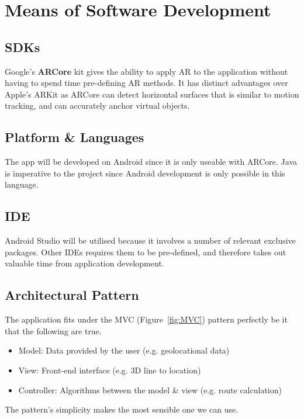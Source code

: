 
\section{Means of Software Development}

\subsection*{SDKs}
Google's \textbf{ARCore} kit gives the ability to apply AR to the application without having to spend time pre-defining AR methods. It has distinct advantages over Apple's ARKit as ARCore can detect horizontal surfaces that is similar to motion tracking, and can accurately anchor virtual objects. \cite{newgenapps}

\subsection*{Platform \& Languages}
The app will be developed on Android since it is only useable with ARCore. Java is imperative to the project since Android development is only possible in this language.

\subsection*{IDE}
Android Studio will be utilised because it involves a number of relevant exclusive packages. Other IDEs requires them to be pre-defined, and therefore takes out valuable time from application development.

\subsection*{Architectural Pattern}
The application fits under the MVC (Figure~\ref{fig:MVC}) pattern perfectly be it that the following are true.
\begin{itemize}
    \item Model: Data provided by the user (e.g. geolocational data)
    \item View: Front-end interface (e.g. 3D line to location)
    \item Controller: Algorithms between the model \& view (e.g. route calculation)
\end{itemize}
The pattern's simplicity makes the most sensible one we can use.


